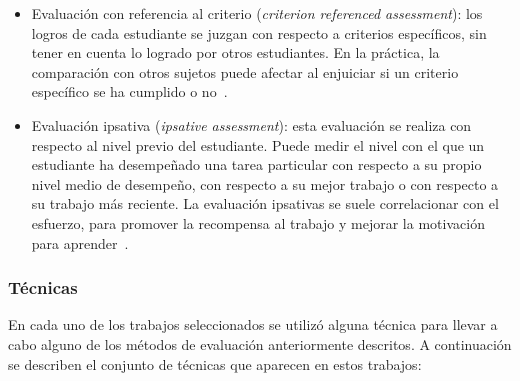 \begin{itemize}
\item Evaluación con referencia al criterio (\emph{criterion referenced assessment}): los logros de cada estudiante se juzgan con respecto a criterios específicos, sin tener en cuenta lo logrado por otros estudiantes. En la práctica, la comparación con otros sujetos puede afectar al enjuiciar si un criterio específico se ha cumplido o no~\cite{dunn2002seeking}.
\item Evaluación ipsativa (\emph{ipsative assessment}): esta evaluación se realiza con respecto al nivel previo del estudiante. Puede medir el nivel con el que un estudiante ha desempeñado una tarea particular con respecto a su propio nivel medio de desempeño, con respecto a su mejor trabajo o con respecto a su trabajo más reciente. La evaluación ipsativas se suele correlacionar con el esfuerzo, para promover la recompensa al trabajo y mejorar la motivación para aprender~\cite{hughes2011towards}.
\end{itemize}

\subsubsection*{Técnicas}
\label{sec:techniques}

En cada uno de los trabajos seleccionados se utilizó alguna técnica para llevar a cabo alguno de los métodos de evaluación anteriormente descritos. A continuación se describen el conjunto de técnicas que aparecen en estos trabajos:


